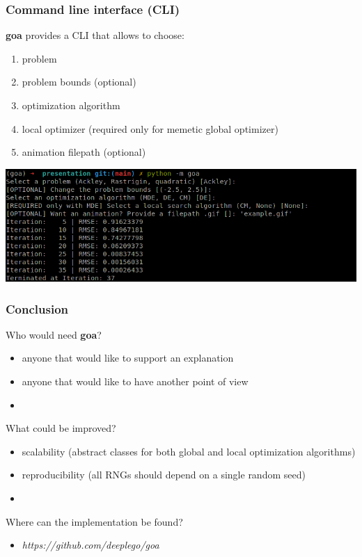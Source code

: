 \documentclass{beamer}
\begin{document}
\begin{frame}
\frametitle{Command line interface (CLI)}
  \textbf{goa} provides a CLI that allows to choose:
  \begin{enumerate}
    \item problem
    \item problem bounds (optional)
    \item optimization algorithm
    \item local optimizer (required only for memetic global optimizer)
    \item animation filepath (optional)
  \end{enumerate}
  \includegraphics[width=1.0\textwidth]{figures/cli-screenshot}
\end{frame}
\begin{frame}
\frametitle{Conclusion}

  Who would need \textbf{goa}?
  \begin{itemize}
    \item anyone that would like to support an explanation
    \item anyone that would like to have another point of view
  \end{itemize}

  \begin{itemize}
    \item[]
  \end{itemize}

  What could be improved?
  \begin{itemize}
    \item scalability (abstract classes for both global and local optimization algorithms)
    \item reproducibility (all RNGs should depend on a single random seed)
  \end{itemize}

  \begin{itemize}
    \item[]
  \end{itemize}

  Where can the implementation be found?
  \begin{itemize}
    \item \textit{https://github.com/deeplego/goa}
  \end{itemize}

\end{frame}
\end{document}
